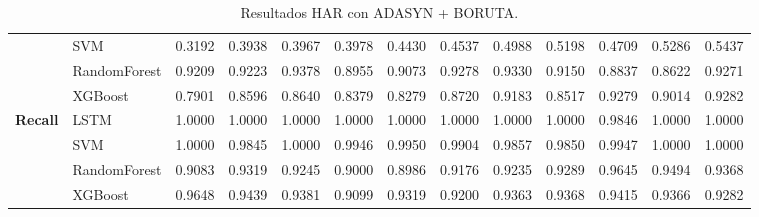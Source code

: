 \begin{table}[h]
\begin{adjustbox}{max width=15cm}
\begin{tabular}{|c|l|r|r|r|r|r|r|r|r|r|r|r|}
			& SVM &  0.3192 &  0.3938 &  0.3967 &  0.3978 &  0.4430 &  0.4537 &  0.4988 &  0.5198 &  0.4709 &  0.5286 &  0.5437 \\
			& RandomForest &  0.9209 &  0.9223 &  0.9378 &  0.8955 &  0.9073 &  0.9278 &  0.9330 &  0.9150 &  0.8837 &  0.8622 &  0.9271 \\
			& XGBoost &  0.7901 &  0.8596 &  0.8640 &  0.8379 &  0.8279 &  0.8720 &  0.9183 &  0.8517 &  0.9279 &  0.9014 &  0.9282 \\
			\hline
			\textbf{Recall} & LSTM &  1.0000 &  1.0000 &  1.0000 &  1.0000 &  1.0000 &  1.0000 &  1.0000 &  1.0000 &  0.9846 &  1.0000 &  1.0000 \\
			& SVM &  1.0000 &  0.9845 &  1.0000 &  0.9946 &  0.9950 &  0.9904 &  0.9857 &  0.9850 &  0.9947 &  1.0000 &  1.0000 \\
			& RandomForest &  0.9083 &  0.9319 &  0.9245 &  0.9000 &  0.8986 &  0.9176 &  0.9235 &  0.9289 &  0.9645 &  0.9494 &  0.9368 \\
			& XGBoost &  0.9648 &  0.9439 &  0.9381 &  0.9099 &  0.9319 &  0.9200 &  0.9363 &  0.9368 &  0.9415 &  0.9366 &  0.9282 \\
			\hline
		\end{tabular}
	\end{adjustbox}
	\caption{Resultados HAR con ADASYN + BORUTA.}
	\label{tab:HAR_ADASYN_BORUTA}
\end{table}

